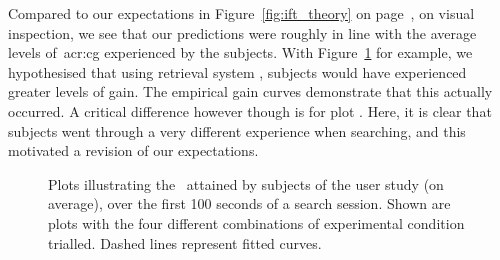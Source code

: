 Compared to our expectations in Figure~\ref{fig:ift_theory} on page~\pageref{fig:ift_theory}, on visual inspection, we see that our predictions were roughly in line with the average levels of~\gls{acr:cg} experienced by the subjects. With Figure~\ref{fig:ift_empirical}  for example, we hypothesised that using retrieval system , subjects would have experienced greater levels of gain. The empirical gain curves demonstrate that this actually occurred. A critical difference however though is for plot . Here, it is clear that subjects went through a very different experience when searching, and this motivated a revision of our expectations.

\begin{figure}[t!]
    \centering
    \caption[\gls{acr:ift} and diversification: empirical results]{Plots illustrating the~ attained by subjects of the user study (on average), over the first 100 seconds of a search session. Shown are plots with the four different combinations of experimental condition trialled. Dashed lines represent fitted curves.\vspace*{-5mm}}
    \label{fig:ift_empirical}
\end{figure}

